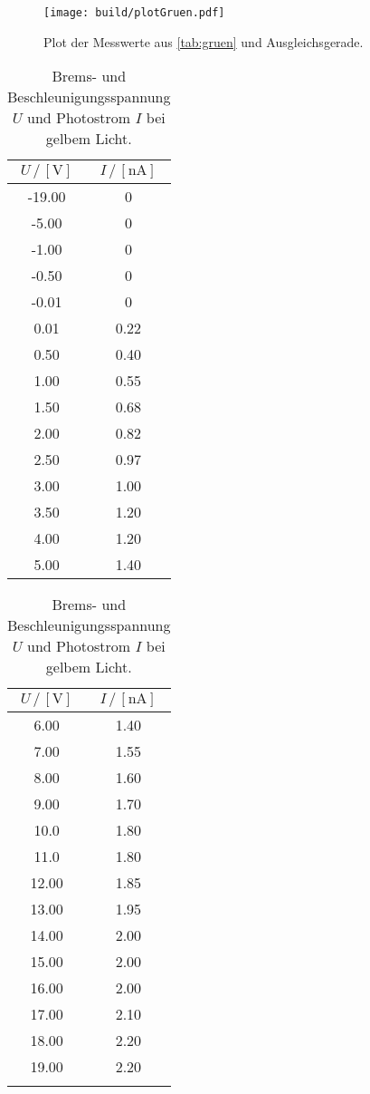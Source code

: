 \begin{figure}[H]
  \centering
  \texttt{[image: build/plotGruen.pdf]}
  \caption{Plot der Messwerte aus \autoref{tab:gruen} und Ausgleichsgerade.}
  \label{fig:plot_gruen}
\end{figure}

\begin{table}[H]
  \centering
  \caption{Brems- und Beschleunigungsspannung $U$ und Photostrom $I$ bei gelbem Licht.}
  \begin{tabular}{|c|c|}
    \toprule
    $U \,/\, [\si{\volt}]$ & $I \,/\, [\si{\nano\ampere}]$\\
    \midrule
    -19.00 & 0\\
    -5.00 & 0\\
    -1.00 & 0\\
    -0.50 & 0\\
    -0.01 & 0\\
    0.01 & 0.22\\
    0.50 & 0.40\\
    1.00 & 0.55\\
    1.50 & 0.68\\
    2.00 & 0.82\\
    2.50 & 0.97\\
    3.00 & 1.00\\
    3.50 & 1.20\\
    4.00 & 1.20\\
    5.00 & 1.40\\
    \bottomrule
  \end{tabular}
  \begin{tabular}{|c|c|}
    \toprule
    $U \,/\, [\si{\volt}]$ & $I \,/\, [\si{\nano\ampere}]$\\
    \midrule
    6.00 & 1.40\\
    7.00 & 1.55\\
    8.00 & 1.60\\
    9.00 & 1.70\\
    10.0 & 1.80\\
    11.0 & 1.80\\
    12.00 & 1.85\\
    13.00 & 1.95\\
    14.00 & 2.00\\
    15.00 & 2.00\\
    16.00 & 2.00\\
    17.00 & 2.10\\
    18.00 & 2.20\\
    19.00 & 2.20\\
    \text{---} & \text{---}\\
    \bottomrule 
  \end{tabular}
  \label{tab:gelb}
\end{table}

